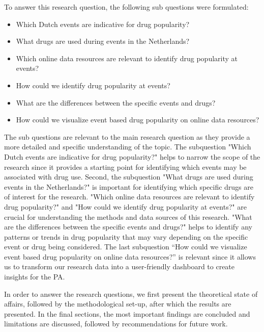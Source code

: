 To answer this research question, the following sub questions were formulated:

\begin{itemize}
  \item Which Dutch events are indicative for drug popularity?
  \item What drugs are used during events in the Netherlands?
  \item Which online data resources are relevant to identify drug popularity at events?
  \item How could we identify drug popularity at events?
  \item What are the differences between the specific events and drugs?
  \item How could we visualize event based drug popularity on online data resources?
\end{itemize}

The sub questions are relevant to the main research question as they provide a more detailed and specific understanding of the topic. The subquestion "Which Dutch events are indicative for drug popularity?" helps to narrow the scope of the research since it provides a starting point for identifying which events may be associated with drug use. Second, the subquestion "What drugs are used during events in the Netherlands?" is important for identifying which specific drugs are of interest for the research. "Which online data resources are relevant to identify drug popularity?" and "How could we identify drug popularity at events?" are crucial for understanding the methods and data sources of this research. "What are the differences between the specific events and drugs?" helps to identify any patterns or trends in drug popularity that may vary depending on the specific event or drug being considered. The last subquestion “How could we visualize event based drug popularity on online data resources?” is relevant since it allows us to transform our research data into a user-friendly dashboard to create insights for the PA.

In order to answer the research questions, we first present the theoretical state of affairs, followed by the methodological set-up, after which the results are presented. In the final sections, the most important findings are concluded and limitations are discussed, followed by recommendations for future work.
